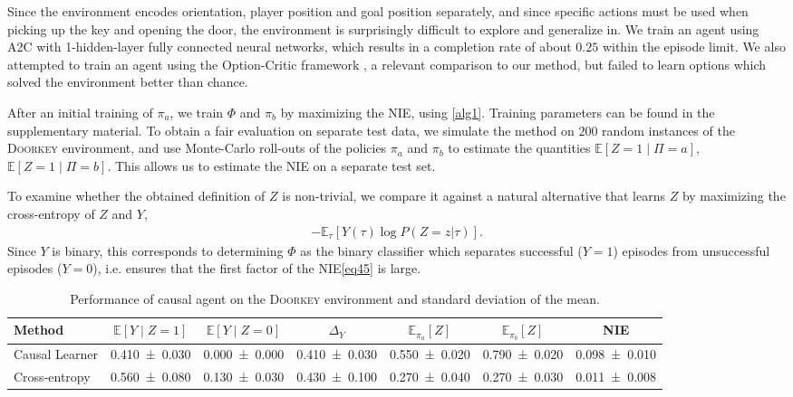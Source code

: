 \documentclass[letterpaper]{article} %
\newcommand{\EE}{\mathbb{E}}
\newcommand{\NIE}{\textrm{NIE}\xspace}
\newcommand{\doorkey}{\textsc{Doorkey}\xspace}
\begin{document}
	
	
	Since the environment encodes orientation, player position and goal position separately, and since specific actions must be used when picking up the key and opening the door, the environment is surprisingly difficult to explore and generalize in. We train an agent using A2C \citep{mnih2016asynchronous} with 1-hidden-layer fully connected neural networks, which results in a completion rate of about $0.25$ within the episode limit. We also attempted to train an agent using the Option-Critic framework \citep{bacon2017option}, a relevant comparison to our method, but failed to learn options which solved the environment better than chance.
	
	
	After an initial training of $\pi_a$, we train $\Phi$ and $\pi_b$ by maximizing the \NIE, using \cref{alg1}. Training parameters can be found in the supplementary material. To obtain a fair evaluation on separate test data, we simulate the method on $200$ random instances of the \doorkey  environment, and use Monte-Carlo roll-outs of the policies $\pi_a$ and $\pi_b$ to estimate the quantities $\EE \left[Z=1 \mid \Pi = a \right]$, $\EE \left[Z=1 \mid \Pi = b \right]$. This allows us to estimate the \NIE on a separate test set. 
	
	To examine whether the obtained definition of $Z$ is non-trivial, we compare it against a natural alternative that learns $Z$ by maximizing the cross-entropy of $Z$ and $Y$, %
	\begin{align}
		-\EE_\tau\left[Y(\tau) \log P(Z=z|\tau)\right]. \label{eq46}
	\end{align}
	Since $Y$ is binary, this corresponds to determining $\Phi$ as the binary classifier which 
	separates successful ($Y=1$) episodes from unsuccessful episodes ($Y=0$), i.e. ensures that the first factor of the \NIE \cref{eq45} is large. 
	
	\begin{table}[t]
		\centering
\begin{tabular}{ lcccccc }
	\toprule Method
	&  $\mathbb{E}[Y\mid Z=1]$
	&  $\mathbb{E}[Y\mid Z=0]$
	&  $\Delta_Y$
	&  $\mathbb{E}_{\pi_a}[Z]$
	&  $\mathbb{E}_{\pi_b}[Z]$
	&  NIE
	\\ \midrule Causal Learner
	&  \SI{0.410\pm 0.030}{}
	&  \SI{0.000\pm 0.000}{}
	&  \SI{0.410\pm 0.030}{}
	&  \SI{0.550\pm 0.020}{}
	&  \SI{0.790\pm 0.020}{}
	&  \SI{0.098\pm 0.010}{}
	\\  Cross-entropy
	&  \SI{0.560\pm 0.080}{}
	&  \SI{0.130\pm 0.030}{}
	&  \SI{0.430\pm 0.100}{}
	&  \SI{0.270\pm 0.040}{}
	&  \SI{0.270\pm 0.030}{}
	&  \SI{0.011\pm 0.008}{}
	\\ \bottomrule\end{tabular}
		\caption{Performance of causal agent on the \doorkey environment and standard deviation of the mean.}\label{tbl_12}
	\end{table}
	
\end{document}

